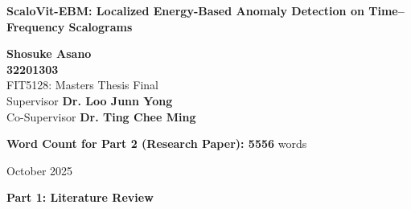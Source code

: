 \thispagestyle{empty}
\begin{center}
    \vspace*{2in}
    
    \Huge\textbf{ScaloVit-EBM: Localized Energy-Based Anomaly Detection on Time–Frequency Scalograms}
    
    \vspace{1.0in}
    
    \Large
    \textbf{Shosuke Asano} \\[0.3cm]
    \textbf{32201303}\\[0.3cm]
    FIT5128: Masters Thesis Final\\[0.3cm]
    Supervisor \textbf{Dr. Loo Junn Yong}\\[0.3cm]
    Co-Supervisor \textbf{Dr. Ting Chee Ming}\\[1cm]


    \vspace{0.5in}
    
    \large
    \textbf{Word Count for Part 2 (Research Paper): 5556} words
    
    \vspace*{\fill}
    
    \normalsize
    October 2025
    
\end{center}

\cleardoublepage
{
\renewcommand{\contentsname}{\huge Contents} %
\normalsize %
\tableofcontents %
}



\cleardoublepage
{} %
\setcounter{page}{1} %
{}
\label{part1}
\onecolumn
\vspace*{3in} %
\begin{center}
    \Huge\textbf{Part 1: Literature Review} \\ %
    \vspace{0.5in}

\end{center}

\cleardoublepage

